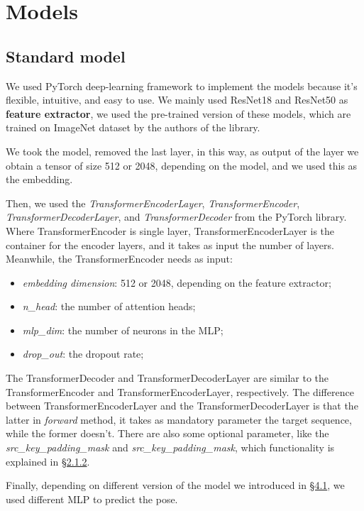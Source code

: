 \section{Models}\label{sec:models}

\subsection{Standard model}\label{subsec:standard-model}
We used PyTorch deep-learning framework to implement the models because it's flexible, intuitive, and easy to use.
We mainly used ResNet18 and ResNet50 as \textbf{feature extractor}, we used the pre-trained version of these models, which are trained on ImageNet dataset by the authors of the library.

We took the model, removed the last layer, in this way, as output of the layer we obtain a tensor of size 512 or 2048, depending on the model, and we used this as the embedding.

Then, we used the \textit{TransformerEncoderLayer}, \textit{TransformerEncoder}, \textit{TransformerDecoderLayer}, and \textit{TransformerDecoder} from the PyTorch library.
Where TransformerEncoder is single layer, TransformerEncoderLayer is the container for the encoder layers, and it takes as input the number of layers.
Meanwhile, the TransformerEncoder needs as input:
\begin{itemize}
    \item \textit{embedding dimension}: 512 or 2048, depending on the feature extractor;
    \item \textit{n\_head}: the number of attention heads;
    \item \textit{mlp\_dim}: the number of neurons in the MLP;
    \item \textit{drop\_out}: the dropout rate;
\end{itemize}
The TransformerDecoder and TransformerDecoderLayer are similar to the TransformerEncoder and TransformerEncoderLayer, respectively.
The difference between TransformerEncoderLayer and the TransformerDecoderLayer is that the latter in \textit{forward} method, it takes as mandatory parameter the target sequence, while the former doesn't.
There are also some optional parameter, like the \textit{src\_key\_padding\_mask} and \textit{src\_key\_padding\_mask}, which functionality is explained in \hyperref[subsec:transformer]{\S2.1.2}.

Finally, depending on different version of the model we introduced in \hyperref[subsec:models]{\S4.1}, we used different MLP to predict the pose.


